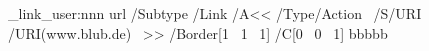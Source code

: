\documentclass{article}
\begin{document}
\ExplSyntaxOn


 \pdf_link_user:nnn { url }
     {
       /Subtype /Link
       /A<<
         /Type/Action~
         /S/URI~
         /URI(www.blub.de)~
       >>
       /Border[1~ 1~ 1]
       /C[0~ 0~ 1]
     }
     {bbbbb}

\ExplSyntaxOff
\end{document}
